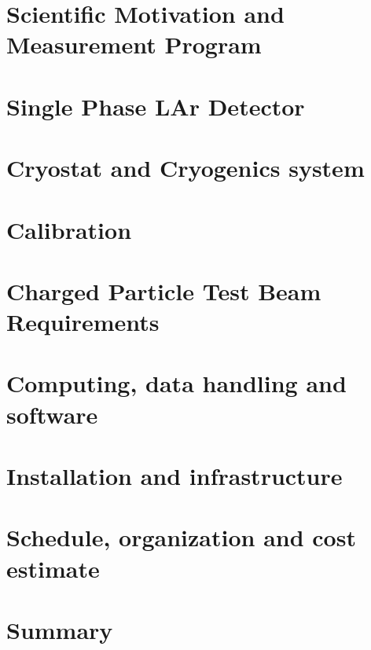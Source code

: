 \documentclass[12pt]{article}
\begin{document}
\section{Scientific Motivation and Measurement Program} %
%	
	

\section{Single Phase LAr Detector} 

	


\section{Cryostat and Cryogenics system} %
	
	
\section{Calibration}
	

\section{Charged Particle Test Beam Requirements} %
	


\section{Computing, data handling and software} %
	

\section{Installation and infrastructure}  %
	
	
	
\section{Schedule, organization and cost estimate} %
	

\section{Summary}  %
	



\end{document}
